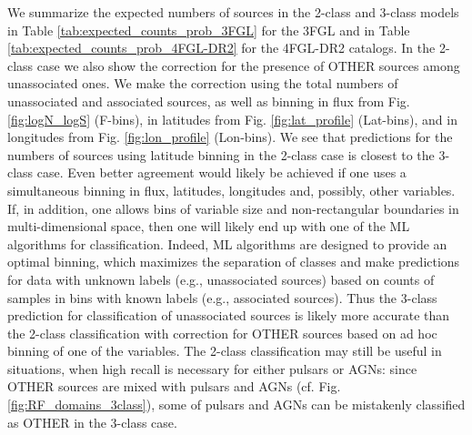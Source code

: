 We summarize the expected numbers of sources in the 2-class and 3-class models in Table \ref{tab:expected_counts_prob_3FGL} for the 3FGL and in Table \ref{tab:expected_counts_prob_4FGL-DR2} for the 4FGL-DR2 catalogs.
In the 2-class case we also show the correction for the presence of OTHER sources among unassociated ones.
We make the correction using the total numbers of unassociated and associated sources, as well as binning in flux from Fig. \ref{fig:logN_logS} (F-bins), in latitudes from Fig. \ref{fig:lat_profile} (Lat-bins), and in longitudes from Fig. \ref{fig:lon_profile} (Lon-bins).
We see that predictions for the numbers of sources using latitude binning in the 2-class case is closest to the 3-class case.
Even better agreement would likely be achieved if one uses a simultaneous binning in flux, latitudes, longitudes and, possibly, other variables.
If, in addition, one allows bins of variable size and non-rectangular boundaries in multi-dimensional space, then one will likely end up with one of the ML algorithms for classification.
Indeed, ML algorithms are designed to provide an optimal binning, which maximizes the separation of classes and make predictions for data with unknown labels (e.g., unassociated sources) based on counts of samples in bins with known labels (e.g., associated sources).
Thus the 3-class prediction for classification of unassociated sources is likely more accurate than the 2-class classification with correction for OTHER sources based on ad hoc binning of one of the variables.
The 2-class classification may still be useful in situations, when high recall is necessary for either pulsars or AGNs:
since OTHER sources are mixed with pulsars and AGNs (cf. Fig. \ref{fig:RF_domains_3class}), 
some of pulsars and AGNs can be mistakenly classified as OTHER in the 3-class case.




